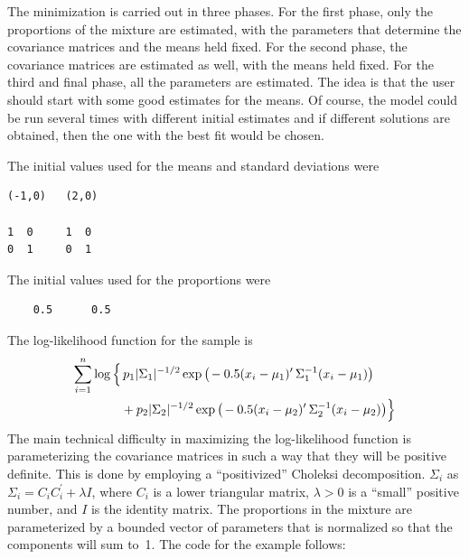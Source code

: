 The minimization is carried out in three phases. For the first phase, only
the proportions of the mixture are estimated, with the parameters that
determine the covariance matrices and the means held fixed. For the second
phase, the covariance matrices are estimated as well, with the means held fixed.
For the third and final phase, all the parameters are estimated.
The idea is that the user should start with some good estimates for
the means.  Of course, the model could be run several times with different
initial estimates and if different solutions are obtained, then the
one with the best fit would be chosen.

The initial values used for the means and standard deviations were
\begin{lstlisting}
(-1,0)   (2,0)

1  0     1  0
0  1     0  1
\end{lstlisting}
The initial values used for the proportions were
\begin{lstlisting}
    0.5      0.5
\end{lstlisting}
The log-likelihood  function for the sample is
 \begin{align}
  \nonumber \sum_{i=1}^n \log \Big\{&\,p_1|\Sigma_1|^{-1/2}\exp\big(\kern-.1em -0.5(x_i-\mu_1)^{\prime}\,
  \Sigma_1^{-1}(x_i-\mu_1)\big) \\
   &+p_2|\Sigma_2|^{-1/2}\exp\big(\kern-.1em -0.5(x_i-\mu_2)^{\prime}\,
  \Sigma_2^{-1}(x_i-\mu_2)\big) \Big\}
 \end{align}
The main technical difficulty in maximizing the log-likelihood
function is parameterizing the covariance matrices in such a way
that they will be positive definite. This is done by employing a
``positivized'' Choleksi decomposition.
$\Sigma_i$ as $\Sigma_i=C_iC_i^{\prime}+\lambda I$, where
$C_i$ is a lower triangular matrix, $\lambda>0$ is a ``small''
positive number, and $I$ is the identity matrix. 
The proportions in the mixture are parameterized by a bounded vector
of parameters that is normalized so that the components will sum to~1.
The code for the example follows:
